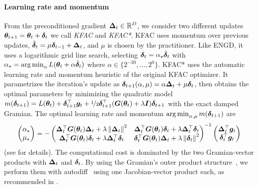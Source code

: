 \paragraph{Learning rate and momentum} From the preconditioned gradient ${\bm{\Delta}}_t \in {\mathbb{R}}^D$, we consider two different updates $ {\bm{\theta}}_{t+1} = {\bm{\theta}}_t + {\bm{\delta}}_{t}$ we call \emph{KFAC} and \emph{KFAC*}.
KFAC uses momentum over previous updates, $\hat{{\bm{\delta}}}_t = \mu {\bm{\delta}}_{t-1} + {\bm{\Delta}}_t$, and $\mu$ is chosen by the practitioner.
Like ENGD, it uses a logarithmic grid line search, selecting ${\bm{\delta}}_t = \alpha_{\star} \hat{{\bm{\delta}}}_t$ with $\alpha_{\star} = \operatorname*{arg\,min}_{\alpha} L({\bm{\theta}}_t + \alpha \hat{{\bm{\delta}}}_t)$ where $\alpha \in \{2^{-30}, \dots, 2^0\}$.
KFAC* uses the automatic learning rate and momentum heuristic of the original KFAC optimizer.
It parametrizes the iteration's update as ${\bm{\delta}}_{t+1}(\alpha, \mu) = \alpha {\bm{\Delta}}_t + \mu {\bm{\delta}}_t$, then obtains the optimal parameters by minimizing the quadratic model $m({\bm{\delta}}_{t+1}) = L({\bm{\theta}}_t) + {\bm{\delta}}_{t+1}^{\top} {\bm{g}}_t + \nicefrac{1}{2}{\bm{\delta}}_{t+1}^{\top} ({\bm{G}}({\bm{\theta}}_t) + \lambda {\bm{I}}) {\bm{\delta}}_{t+1}$ with the exact damped Gramian.
The optimal learning rate and momentum $\operatorname*{arg\,min}_{\alpha, \mu} m({\bm{\delta}}_{t+1})$ are
\begin{align*}
  \begin{pmatrix}
    \alpha_{\star} \\ \mu_{\star}
  \end{pmatrix}
  =
  -
  \begin{pmatrix}
    {\bm{\Delta}}_t^{\top} {\bm{G}}({\bm{\theta}}_t) {\bm{\Delta}}_t + \lambda \left\lVert {\bm{\Delta}}_t \right\rVert^2
    & {\bm{\Delta}}_t^{\top} {\bm{G}}({\bm{\theta}}_t) {\bm{\delta}}_t + \lambda {\bm{\Delta}}^{\top}_t {\bm{\delta}}_t
    \\
    {\bm{\Delta}}_t^{\top} {\bm{G}}({\bm{\theta}}_t) {\bm{\delta}}_t + \lambda {\bm{\Delta}}^{\top}_t {\bm{\delta}}_t
    &
      {\bm{\delta}}_t^{\top} {\bm{G}}({\bm{\theta}}_t) {\bm{\Delta}}_t + \lambda \left\lVert {\bm{\delta}}_t \right\rVert^2
  \end{pmatrix}^{-1}
  \begin{pmatrix}
    {\bm{\Delta}}_t^{\top} {\bm{g}}_t
    \\
    {\bm{\delta}}_t^{\top} {\bm{g}}_t
  \end{pmatrix}
\end{align*}
(see \citep[][Section 7]{martens2015optimizing} for details).
The computational cost is dominated by the two Gramian-vector products with ${\bm{\Delta}}_t$ and ${\bm{\delta}}_t$.
By using the Gramian's outer product structure~\cite{dangel2022vivit,papyan2019measurements}, we perform them with autodiff~\citep{pearlmutter1994fast,schraudolph2002fast} using one Jacobian-vector product each, as recommended in \cite{martens2015optimizing}.

